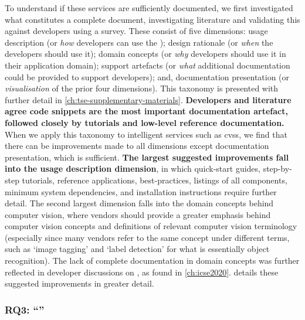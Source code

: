 To understand if these services are sufficiently documented, we first investigated what constitutes a complete  document, investigating literature and  validating this against developers using a survey. These consist of five dimensions: usage description (or \textit{how} developers can use the ); design rationale (or \textit{when} the developers should use it); domain concepts (or \textit{why} developers should use it in their application domain); support artefacts (or \textit{what} additional documentation could be provided to support developers); and, documentation presentation (or \textit{visualisation} of the prior four dimensions). This taxonomy is presented with further detail in \cref{ch:tse-supplementary-materials}. \textbf{Developers and literature agree code snippets are the most important documentation artefact, followed closely by tutorials and low-level reference documentation.}
When we apply this taxonomy to intelligent services such as \glspl{cvs}, we find that there can be improvements made to all dimensions except documentation presentation, which is sufficient. \textbf{The largest suggested improvements fall into the usage description dimension}, in which quick-start guides, step-by-step tutorials, reference applications, best-practices, listings of all  components, minimum system dependencies, and installation instructions require further detail. The second largest dimension falls into the domain concepts behind computer vision, where vendors should provide a greater emphasis behind computer vision concepts and definitions of relevant computer vision terminology (especially since many vendors refer to the same concept under different terms, such as `image tagging' and `label detection' for what is essentially object recognition). The lack of complete documentation in domain concepts was further reflected in developer discussions on , as found in \cref{ch:icse2020}.  details these suggested improvements in greater detail.

\subsubsection[Answering RQ3]{RQ3: ``\RQThreeTextDevMiscomprehension{}''}

